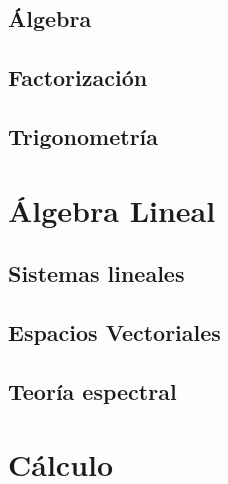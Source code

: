 \documentclass[
]{tufte-book}
\begin{document}
\chapter{Álgebra}








\chapter{Factorización}







\chapter{Trigonometría}




\part{Álgebra Lineal}

\chapter{Sistemas lineales}





\chapter{Espacios Vectoriales}







\chapter{Teoría espectral}





\part{Cálculo}
\end{document}
